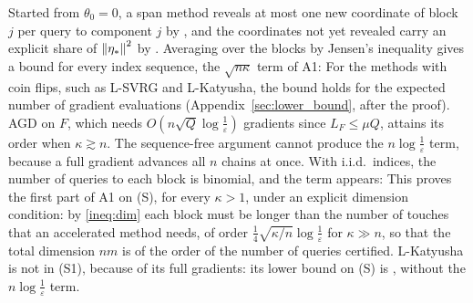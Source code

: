 Started from $\theta_0=0$, a span method reveals at most one new coordinate of block $j$ per query to component $j$
by , and the coordinates not yet revealed carry an explicit share of $\left\|\eta_\ast\right\|^2$
by . Averaging over the blocks by Jensen's inequality gives a bound for every index sequence, the
$\sqrt{n\kappa}$ term of A1:
For the methods with coin flips, such as L-SVRG and L-Katyusha, the bound holds for the expected number of gradient
evaluations (Appendix~\ref{sec:lower_bound}, after the proof). AGD on $F$, which needs $O(n\sqrt Q\log\frac1\varepsilon)$
gradients since $L_F\le\mu Q$, attains its order when $\kappa\gtrsim n$. The sequence-free argument cannot produce the
$n\log\frac1\varepsilon$ term, because a full gradient advances all $n$ chains at once. With i.i.d.\ indices, the number
of queries to each block is binomial, and the term appears:
This proves the first part of A1 on (S), for every $\kappa>1$, under an explicit dimension condition: by \eqref{ineq:dim}
each block must be longer than the number of touches that an accelerated method needs, of order
$\frac14\sqrt{\kappa/n}\log\frac1\varepsilon$ for $\kappa\gg n$, so that the total dimension $nm$ is of the order of the
number of queries certified. L-Katyusha is not in (S1), because of its full gradients: its lower bound on (S) is
, without the $n\log\frac1\varepsilon$ term.

